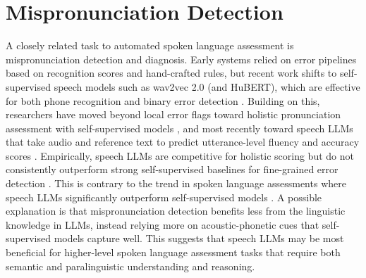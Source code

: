 \documentclass{report}
\begin{document}
\section{Mispronunciation Detection}
\label{sec:mispronunciation_detection}
A closely related task to automated spoken language assessment is mispronunciation detection and diagnosis. Early systems relied on error pipelines based on recognition scores and hand-crafted rules, but recent work shifts to self-supervised speech models such as wav2vec 2.0 (and HuBERT), which are effective for both phone recognition and binary error detection \citep{peng21e_interspeech,inproceedings_wu_mdd,xu21k_interspeech}. Building on this, researchers have moved beyond local error flags toward holistic pronunciation assessment with self-supervised models \citep{kim2022automaticpronunciationassessmentusing}, and most recently toward speech LLMs that take audio and reference text to predict utterance-level fluency and accuracy scores \citep{fu2024pronunciationassessmentmultimodallarge}. Empirically, speech LLMs are competitive for holistic scoring but do not consistently outperform strong self-supervised baselines for fine-grained error detection \citep{kim2022automaticpronunciationassessmentusing, fu2024pronunciationassessmentmultimodallarge}. This is contrary to the trend in spoken language assessments where speech LLMs significantly outperform self-supervised models \citep{ma2025assessment}. A possible explanation is that mispronunciation detection benefits less from the linguistic knowledge in LLMs, instead relying more on acoustic-phonetic cues that self-supervised models capture well. This suggests that speech LLMs may be most beneficial for higher-level spoken language assessment tasks that require both semantic and paralinguistic understanding and reasoning.
\end{document}
